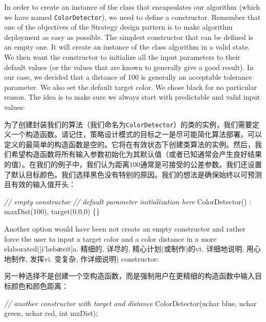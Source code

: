 \documentclass[]{article}
\newenvironment{Shaded}{}{}
\newcommand{\CommentTok}[1]{\textcolor[rgb]{0.38,0.63,0.69}{\textit{#1}}}
\newcommand{\DataTypeTok}[1]{\textcolor[rgb]{0.56,0.13,0.00}{#1}}
\newcommand{\DecValTok}[1]{\textcolor[rgb]{0.25,0.63,0.44}{#1}}
\newcommand{\ExtensionTok}[1]{#1}
\newcommand{\NormalTok}[1]{#1}
\begin{document}
In order to create an instance of the class that encapsulates our
algorithm (which we have named \texttt{ColorDetector}), we need to
define a constructor. Remember that one of the objectives of the
Strategy design pattern is to make algorithm deployment as easy as
possible. The simplest constructor that can be defined is an empty one.
It will create an instance of the class algorithm in a valid state. We
then want the constructor to initialize all the input parameters to
their default values (or the values that are known to generally give a
good result). In our case, we decided that a distance of 100 is
generally an acceptable tolerance parameter. We also set the default
target color. We chose black for no particular reason. The idea is to
make sure we always start with predictable and valid input values:

为了创建封装我们的算法（我们命名为\texttt{ColorDetector}）的类的实例，我们需要定义一个构造函数。请记住，策略设计模式的目标之一是尽可能简化算法部署。可以定义的最简单的构造函数是空的。它将在有效状态下创建类算法的实例。然后，我们希望构造函数将所有输入参数初始化为其默认值（或者已知通常会产生良好结果的值）。在我们的例子中，我们认为距离100通常是可接受的公差参数。我们还设置了默认目标颜色。我们选择黑色没有特别的原因。我们的想法是确保始终以可预测且有效的输入值开头：

\begin{Shaded}
\begin{Highlighting}[]
\CommentTok{// empty constructor}
\CommentTok{// default parameter initialization here}
\NormalTok{ColorDetector() : maxDist(}\DecValTok{100}\NormalTok{), target(}\DecValTok{0}\NormalTok{,}\DecValTok{0}\NormalTok{,}\DecValTok{0}\NormalTok{) \{\}}
\end{Highlighting}
\end{Shaded}

Another option would have been not create an empty constructor and
rather force the user to input a target color and a color distance in a
more elaborated({[}i'læbәreit{]}a. 精细的, 详尽的, 精心计划(或制作)的vt.
详细地说明, 用心地制作, 发挥vi. 变复杂, 作详细说明) constructor:

另一种选择不是创建一个空构造函数，而是强制用户在更精细的构造函数中输入目标颜色和颜色距离：

\begin{Shaded}
\begin{Highlighting}[]
\CommentTok{// another constructor with target and distance}
\NormalTok{ColorDetector(}\ExtensionTok{uchar}\NormalTok{ blue, }\ExtensionTok{uchar}\NormalTok{ green, }\ExtensionTok{uchar}\NormalTok{ red, }\DataTypeTok{int}\NormalTok{ mxDist);}
\end{Highlighting}
\end{Shaded}
\end{document}
